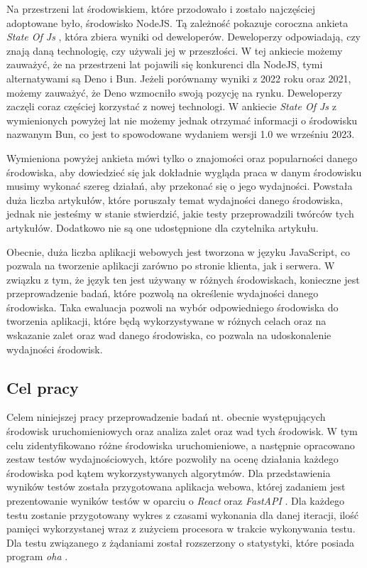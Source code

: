 Na przestrzeni lat środowiskiem, które przodowało i zostało najczęściej adoptowane było, środowisko NodeJS. Tą zależność pokazuje coroczna ankieta \textit{State Of Js} \cite{State_of_js:2021} \cite{State_of_js:2022}, która zbiera wyniki od deweloperów. Deweloperzy odpowiadają, czy znają daną technologię, czy używali jej w przeszłości. W tej ankiecie możemy zauważyć, że na przestrzeni lat pojawili się konkurenci dla NodeJS, tymi alternatywami są Deno i Bun. Jeżeli porównamy wyniki z 2022 roku oraz 2021, możemy zauważyć, że Deno wzmocniło swoją pozycję na rynku. Deweloperzy zaczęli coraz częściej korzystać z nowej technologi. W ankiecie \textit{State Of Js} \cite{State_of_js:2021} \cite{State_of_js:2022} z wymienionych powyżej lat nie możemy jednak otrzymać informacji o środowisku nazwanym Bun, co jest to spowodowane wydaniem wersji 1.0 we wrześniu 2023.

Wymieniona powyżej ankieta mówi tylko o znajomości oraz popularności danego środowiska, aby dowiedzieć się jak dokładnie wygląda praca w danym środowisku musimy wykonać szereg działań, aby przekonać się o jego wydajności. Powstała duża liczba artykułów, które poruszały temat wydajności danego środowiska, jednak nie jesteśmy w stanie stwierdzić, jakie testy przeprowadzili twórców tych artykułów. Dodatkowo nie są one udostępnione dla czytelnika artykułu.

Obecnie, duża liczba aplikacji webowych jest tworzona w języku JavaScript, co pozwala na tworzenie aplikacji zarówno po stronie klienta, jak i serwera. W związku z tym, że język ten jest używany w różnych środowiskach, konieczne jest przeprowadzenie badań, które pozwolą na określenie wydajności danego środowiska. Taka ewaluacja pozwoli na wybór odpowiedniego środowiska do tworzenia aplikacji, które będą wykorzystywane w różnych celach oraz na wskazanie zalet oraz wad danego środowiska, co pozwala na udoskonalenie wydajności środowisk.  

\subsection{Cel pracy}
Celem niniejszej pracy przeprowadzenie badań nt. obecnie występujących środowisk uruchomieniowych oraz analiza zalet oraz wad tych środowisk. W tym celu zidentyfikowano różne środowiska uruchomieniowe, a następnie opracowano zestaw testów wydajnościowych, które pozwoliły na ocenę działania każdego środowiska pod kątem wykorzystywanych algorytmów. Dla przedstawienia wyników testów  została przygotowana aplikacja webowa, której zadaniem jest prezentowanie wyników testów w oparciu o \textit{React} \cite{React} oraz \textit{FastAPI} \cite{FastAPI}. Dla każdego testu zostanie przygotowany wykres z czasami wykonania dla danej iteracji, ilość pamięci wykorzystanej wraz z zużyciem procesora w trakcie wykonywania testu. Dla testu związanego z żądaniami  został rozszerzony o statystyki, które posiada program \textit{oha} \cite{oha}.

